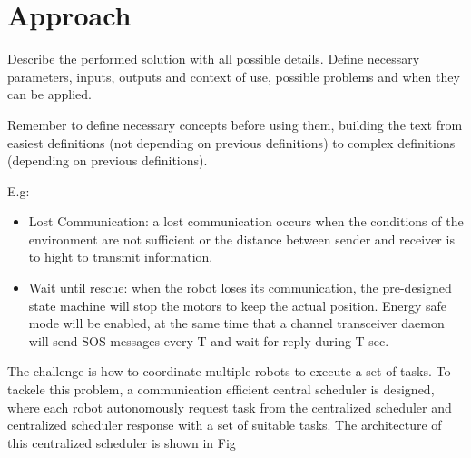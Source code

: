 \chapter{Approach}

Describe the performed solution with all possible details. Define necessary parameters, inputs, outputs and context of use, possible problems and when they can be applied. 

Remember to define necessary concepts before using them, building the text from easiest definitions (not depending on previous definitions) to complex definitions (depending on previous definitions).

E.g: 
\begin{itemize}
	\item Lost Communication: a lost communication occurs when the conditions of the environment are not sufficient or the distance between sender and receiver is to hight to transmit information.
	\item Wait until rescue: when the robot loses its communication, the pre-designed state machine will stop the motors to keep the actual position. Energy safe mode will be enabled, at the same time that a channel transceiver daemon will send SOS messages every T and wait for reply during T sec. 
\end{itemize}

The challenge is how to coordinate multiple robots to execute a set of tasks. To tackele this problem, a communication efficient central scheduler is designed, where each robot autonomously request task from the centralized scheduler and centralized scheduler response with a set of suitable tasks. The architecture of this centralized scheduler is shown in Fig